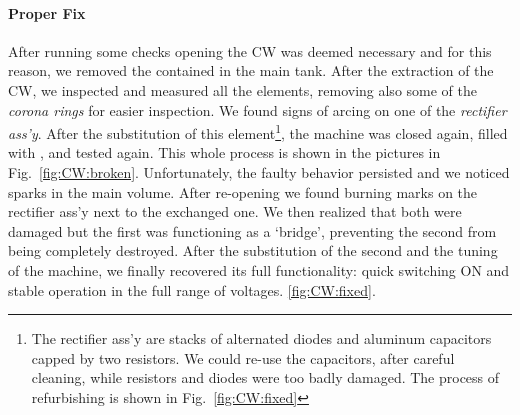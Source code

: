 \begin{refsection}
    \paragraph{Proper Fix}
    After running some checks opening the CW was deemed necessary and for this reason, we removed the  contained in the main tank. 
    After the extraction of the CW, we inspected and measured all the elements, removing also some of the \textit{corona rings} for easier inspection. 
    We found signs of arcing on one of the \textit{rectifier ass'y}. 
    After the substitution of this element\footnote{The rectifier ass'y are stacks of alternated diodes and aluminum capacitors capped by two resistors. We could re-use the capacitors, after careful cleaning, while resistors and diodes were too badly damaged. The process of refurbishing is shown in Fig.~\ref{fig:CW:fixed}}, the machine was closed again, filled with , and tested again.
    This whole process is shown in the pictures in Fig.~\ref{fig:CW:broken}.
    Unfortunately, the faulty behavior persisted and we noticed sparks in the main volume. 
    After re-opening we found burning marks on the rectifier ass'y next to the exchanged one.
    We then realized that both were damaged but the first was functioning as a `bridge', preventing the second from being completely destroyed. 
    After the substitution of the second and the tuning of the machine, we finally recovered its full functionality: quick switching ON and stable operation in the full range of voltages.
    \ref{fig:CW:fixed}.


\end{refsection}
